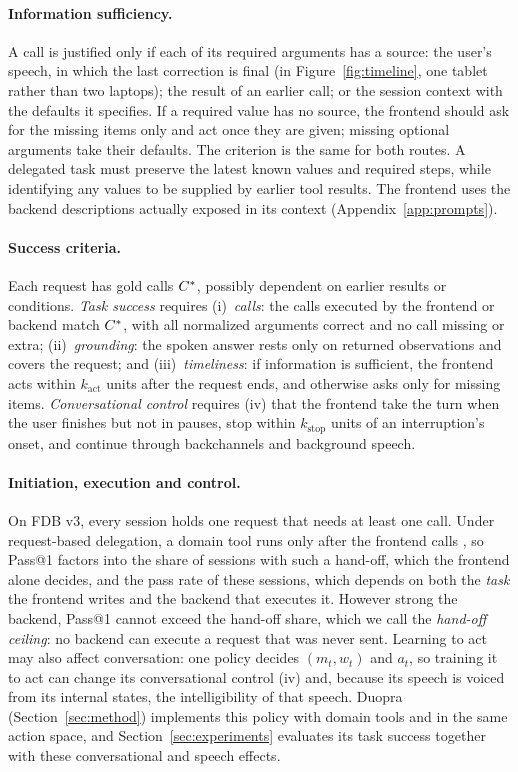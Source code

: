 \paragraph{Information sufficiency.}
A call is justified only if each of its required arguments has a source: the user's speech, in which the last correction is final (in Figure~\ref{fig:timeline}, one tablet rather than two laptops); the result of an earlier call; or the session context with the defaults it specifies.
If a required value has no source, the frontend should ask for the missing items only and act once they are given; missing optional arguments take their defaults.
The criterion is the same for both routes. A delegated task must preserve the latest known values and required steps, while identifying any values to be supplied by earlier tool results. The frontend uses the backend descriptions actually exposed in its context (Appendix~\ref{app:prompts}).

\paragraph{Success criteria.}
Each request has gold calls $C^{\ast}$, possibly dependent on earlier results or conditions.
\emph{Task success} requires (i)~\emph{calls}: the calls executed by the frontend or backend match $C^{\ast}$, with all normalized arguments correct and no call missing or extra; (ii)~\emph{grounding}: the spoken answer rests only on returned observations and covers the request; and (iii)~\emph{timeliness}: if information is sufficient, the frontend acts within $k_{\mathrm{act}}$ units after the request ends, and otherwise asks only for missing items.
\emph{Conversational control} requires (iv) that the frontend take the turn when the user finishes but not in pauses, stop within $k_{\mathrm{stop}}$ units of an interruption's onset, and continue through backchannels and background speech.

\paragraph{Initiation, execution and control.}
On FDB v3, every session holds one request that needs at least one call.
Under request-based delegation, a domain tool runs only after the frontend calls , so Pass@1 factors into the share of sessions with such a hand-off, which the frontend alone decides, and the pass rate of these sessions, which depends on both the \textit{task} the frontend writes and the backend that executes it.
However strong the backend, Pass@1 cannot exceed the hand-off share, which we call the \emph{hand-off ceiling}: no backend can execute a request that was never sent.
Learning to act may also affect conversation: one policy decides $(m_t,w_t)$ and $a_t$, so training it to act can change its conversational control (iv) and, because its speech is voiced from its internal states, the intelligibility of that speech.
Duopra (Section~\ref{sec:method}) implements this policy with domain tools and  in the same action space, and Section~\ref{sec:experiments} evaluates its task success together with these conversational and speech effects.

